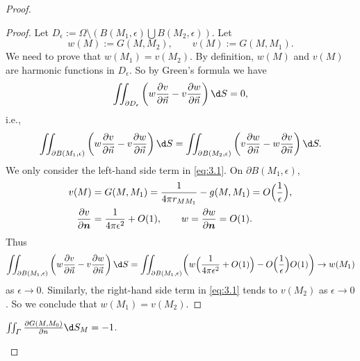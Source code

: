\begin{proof}
  \begin{proof}
    Let $D_{\epsilon}:=\varOmega\setminus(B(M_1,\epsilon)\bigcup B(M_2,\epsilon))$.
    Let
    \[ w(M):=G(M,M_2), \qquad v(M):=G(M,M_1). \]
    We need to prove that $w(M_1)=v(M_2)$.
    By definition, $w(M)$ and $v(M)$ are harmonic functions in $D_{\epsilon}$.
    So by Green's formula we have
    \[ \iint_{\partial D_{\epsilon}}\left(w\frac{\partial v}{\partial\vec{n}}
      -v\frac{\partial w}{\partial\vec{n}}\right)\d S = 0, \]
    i.e.,
    \begin{equation}\label{eq:3.1}
      \iint_{\partial B(M_1,\epsilon)}
      \left(w\frac{\partial v}{\partial\vec{n}}-v\frac{\partial w}{\partial\vec{n}}\right)\d S
      = \iint_{\partial B(M_2,\epsilon)}
        \left(v\frac{\partial w}{\partial\vec{n}}-w\frac{\partial v}{\partial\vec{n}}\right)\d S.
    \end{equation}
    We only consider the left-hand side term in \eqref{eq:3.1}.
    On $\partial B(M_1,\epsilon)$,
    \begin{align*}
      v(M) & = G(M,M_1) = \frac{1}{4\pi r_{MM_1}} -g(M,M_1) = O\Bigl(\frac{1}{\epsilon}\Bigr), \\
      \frac{\partial v}{\partial\bm{n}} & = \frac{1}{4\pi\epsilon^2} + O(1), \qquad
      w = \frac{\partial w}{\partial\bm{n}} = O(1).
    \end{align*}
    Thus
    \[ \iint_{\partial B(M_1,\epsilon)}
      \left(w\frac{\partial v}{\partial\vec{n}}-v\frac{\partial w}{\partial\vec{n}}\right)\d S
      = \iint_{\partial B(M_1,\epsilon)} \biggl(w\Bigl(\frac{1}{4\pi\epsilon^2} + O(1)\Bigr)
          - O\Bigl(\frac{1}{\epsilon}\Bigr)O(1)\biggr)
      \to w(M_1)\]
    as $\epsilon\to 0$. Similarly, the right-hand side term in \eqref{eq:3.1}
    tends to $v(M_2)$ as $\epsilon\to 0$. So we conclude that $w(M_1)=v(M_2)$.
  \end{proof}

  \begin{property}
    $\iint_{\varGamma} \frac{\partial G(M, M_0)}{\partial n} \d S_M = -1$.

  \end{property}
  

\end{proof}
